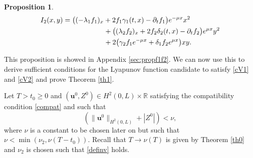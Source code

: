 \documentclass[JEP,XML,SOM,Unicode]{cedram}
\newtheorem{prop}[thm]{Proposition}
\theoremstyle{definition}
\begin{document}
{\begin{prop}
\begin{equation*}
\begin{split}
I_{2}(x,y)&=\bigl((-\lambda_{1}f_{1})_{x}+2f_{1}\gamma_{1}(t,x)-\partial_{t}f_{1}\bigr)e^{-\mu x}x^{2}\\
&\hspace*{2.06cm}+\bigl((\lambda_{2}f_{2})_{x}+2f_{2}\delta_{2}(t,x)-\partial_{t}f_{2}\bigr)e^{\mu x}y^{2}\\
&\hspace*{2.06cm}+2 \bigl(\gamma_{2}f_{1}e^{-\mu x}+\delta_{1}f_{2}e^{\mu x} \bigr)xy.
\end{split}
\end{equation*}
\end{prop}
This proposition is showed in Appendix \ref{sec:propf1f2}. We can now use this to derive sufficient conditions for the Lyapunov function candidate to satisfy \eqref{cV1} and \eqref{cV2} and prove Theorem \ref{th1}.}

\label{sec:sufficient}
Let $T>{t_{0}\geq0}$ and $(\boldsymbol{u}^{0},Z^{0})\in H^{2}(0,L)\times\mathbb{R}$ satisfying the compatibility condition \eqref{compat} and such that
\begin{equation}
\label{boundu1}
\left(\lVert \boldsymbol{u}^{0}\rVert_{H^{2}(0,L)}+|Z^{0}|\right)<\nu,
\end{equation}
where $\nu$ is a constant to be chosen later on but such that $\nu<\min(\nu_{2},\nu(T-t_{0}))$. Recall that ${T\to \nu(T)}$ is given by Theorem \ref{th0} {and $\nu_{2}$ is chosen such that \eqref{definv} holds}.
\end{document}

